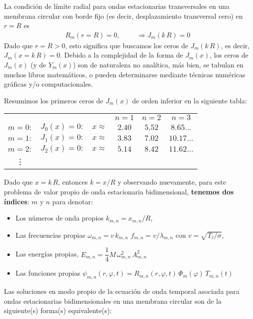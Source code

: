 \par
La condición de límite radial para ondas estacionarias transversales en una membrana circular con borde fijo (es decir, desplazamiento transversal cero) en $r = R$ es
\begin{align*}
R_{m} (r = R) = 0, \hspace{1cm} \Longrightarrow J_{m} (k \, R) = 0
\end{align*}
Dado que $r = R > 0$, esto significa que buscamos los ceros de $J_{m} (k \, R)$, es decir, $J_{m} (x = k \,R) = 0$. Debido a la complejidad de la forma de $J_{m} (x)$, los ceros de $J_{m} (x)$ (y de $Y_{m} (x)$) son de naturaleza no analítica, más bien, se tabulan en muchos libros matemáticos, o pueden determinarse mediante técnicas numéricas gráficas y/o computacionales.
\par
Resumimos los primeros ceros de $J_{m} (x)$ de orden inferior en la siguiente tabla:
\begin{table}[H]
\centering
\begin{tabular}{c c c c c c}
 & & & $n=1$ & $n=2$ & $n=3$ \\
$m=0:$ & $J_{0}(x)=0:$ & $x \approx$ & $2.40$ & $5.52$ & $8.65  \ldots$ \\
$m=1:$ & $J_{1}(x)=0:$ & $x \approx$ & $3.83$ & $7.02$ & $10.17 \ldots$ \\
$m=2:$ & $J_{2}(x)=0:$ & $x \approx$ & $5.14$ & $8.42$ & $11.62 \ldots$ \\
\vdots
\end{tabular}
\end{table}
Dado que $x = k \, R$, entonces $k = x / R$ y observando nuevamente, para este problema de valor propio de onda estacionaria bidimensional, \textbf{tenemos dos índices}: $m$ y $n$ para denotar:
\begin{itemize}
\item Los números de onda propios $k_{m, n}= x_{m, n} / R$,
\item Las frecuencias propias $\omega_{m, n}  = v \, k_{m, n}$  $f_{m, n} = v / \lambda_{m, n}$ con $v = \sqrt{T_{\ell} / \sigma}$,
\item  Las energías propias, $E_{m, n} = \dfrac{1}{4} M \, \omega_{m, n}^{2} \, A_{m, n}^{2}$
\item Las funciones propias $\psi_{m, n} (r, \varphi, t) = R_{m,n} (r, \varphi, t) \, \Phi_{m} (\varphi) \, T_{m, n} (t)$
\end{itemize}
Las soluciones en modo propio de la ecuación de onda temporal asociada para ondas estacionarias bidimensionales en una membrana circular son de la siguiente(s) forma(s) equivalente(s):
